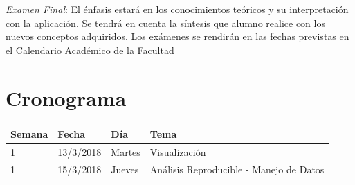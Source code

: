 \documentclass[]{book}
\theoremstyle{definition}
\theoremstyle{definition}
\theoremstyle{definition}
\theoremstyle{remark}
\begin{document}
\emph{Examen Final}: El énfasis estará en los conocimientos teóricos y
su interpretación con la aplicación. Se tendrá en cuenta la síntesis que
alumno realice con los nuevos conceptos adquiridos. Los exámenes se
rendirán en las fechas previstas en el Calendario Académico de la
Facultad

\hypertarget{cronograma}{%
\section{Cronograma}\label{cronograma}}

\begin{longtable}[]{@{}llll@{}}
\toprule
\begin{minipage}[b]{0.05\columnwidth}\raggedright
Semana\strut
\end{minipage} & \begin{minipage}[b]{0.07\columnwidth}\raggedright
Fecha\strut
\end{minipage} & \begin{minipage}[b]{0.05\columnwidth}\raggedright
Día\strut
\end{minipage} & \begin{minipage}[b]{0.71\columnwidth}\raggedright
Tema\strut
\end{minipage}\tabularnewline
\midrule
\endhead
\begin{minipage}[t]{0.05\columnwidth}\raggedright
1\strut
\end{minipage} & \begin{minipage}[t]{0.07\columnwidth}\raggedright
13/3/2018\strut
\end{minipage} & \begin{minipage}[t]{0.05\columnwidth}\raggedright
Martes\strut
\end{minipage} & \begin{minipage}[t]{0.71\columnwidth}\raggedright
Visualización\strut
\end{minipage}\tabularnewline
\begin{minipage}[t]{0.05\columnwidth}\raggedright
1\strut
\end{minipage} & \begin{minipage}[t]{0.07\columnwidth}\raggedright
15/3/2018\strut
\end{minipage} & \begin{minipage}[t]{0.05\columnwidth}\raggedright
Jueves\strut
\end{minipage} & \begin{minipage}[t]{0.71\columnwidth}\raggedright
Análisis Reproducible - Manejo de Datos\strut

\end{minipage}
\end{longtable}
\end{document}
